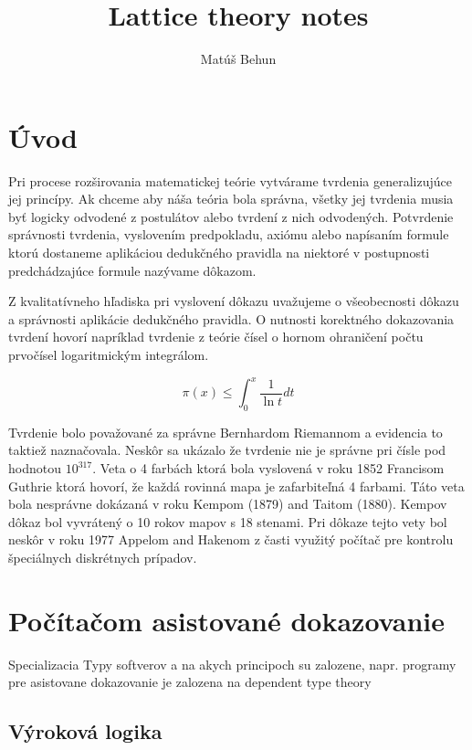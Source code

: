 \documentclass[a4paper,10pt,oneside]{report}%
\author{Mat\'u\v{s} Behun}
\title{Lattice theory notes}
\begin{document}
\section{Úvod}

Pri procese rozširovania matematickej teórie vytvárame tvrdenia generalizujúce jej princípy.
Ak chceme aby náša teória bola správna, všetky jej tvrdenia musia byť logicky odvodené z postulátov alebo tvrdení z nich odvodených.
Potvrdenie správnosti tvrdenia, vyslovením predpokladu, axiómu alebo napísaním formule ktorú dostaneme aplikáciou dedukčného pravidla na niektoré v postupnosti predchádzajúce formule nazývame dôkazom.

Z kvalitatívneho hľadiska pri vyslovení dôkazu uvažujeme o všeobecnosti dôkazu a správnosti aplikácie dedukčného pravidla.
O nutnosti korektného dokazovania tvrdení hovorí napríklad tvrdenie z teórie čísel o hornom ohraničení počtu prvočísel logaritmickým integrálom.

\begin{equation}
    \pi(x) \leq \int_{0}^{x} \frac{1}{ \ln{t} } dt
\end{equation}

Tvrdenie bolo považované za správne Bernhardom Riemannom a evidencia to taktiež naznačovala.
Neskôr sa ukázalo že tvrdenie nie je správne pri čísle pod hodnotou $10^{317}$.
Veta o 4 farbách ktorá bola vyslovená v roku 1852 Francisom Guthrie ktorá hovorí, že každá rovinná mapa je zafarbiteľná 4 farbami.
Táto veta bola nesprávne dokázaná v roku Kempom (1879) and Taitom (1880). Kempov dôkaz bol vyvrátený o 10 rokov mapov s 18 stenami.
Pri dôkaze tejto vety bol neskôr v roku 1977 Appelom and Hakenom z časti využitý počítač pre kontrolu špeciálnych diskrétnych prípadov.

\section{Počítačom asistované dokazovanie}

Specializacia 
Typy softverov a na akych principoch su zalozene, napr. programy pre asistovane dokazovanie je zalozena na dependent type theory


\subsection{Výroková logika}
\end{document}
